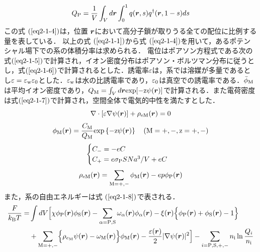 \documentclass[10.5pt,a4j]{jarticle}
\newcommand{\bvec}[1]{
\mbox{\boldmath $#1$}
}%
\begin{document}
\begin{equation}
\label{eq2-1-4}
Q_{\rm{P}}=\frac{1}{V}\int_{V} d{\bvec r}
\int_{0}^{1} q( \bvec{r},s )q^{\dag}( \bvec{r},1-s ) ds
\end{equation}
%
%
この式 $ (\ref{eq2-1-4}) $は，位置 $  \bvec{r} $において高分子鎖が取りうる全ての配位に比例する量を表している．
以上の式 $ (\ref{eq2-1-1}) $から式 $ (\ref{eq2-1-4}) $を用いて，あるポテンシャル場下での系の体積分率は求められる．
%
電位はポアソン方程式である次の式$(\ref{eq2-1-5})$で計算され，イオン密度分布はポアソン・ボルツマン分布に従うとし，式$(\ref{eq2-1-6})$で計算されるとした．誘電率$\varepsilon$は，系では溶媒が多量であるとし$\varepsilon=\varepsilon_{\rm{w}}\varepsilon_{0}$とした．$\varepsilon_{\rm{w}}$は水の比誘電率であり，$\varepsilon_{\rm{0}}$は真空での誘電率である．$\bar{\phi}_{\rm{M}}$は平均イオン密度であり，$Q_{\rm{M}}=\int_{V} d\bvec{r}\rm{exp}[-z\psi(\bvec{r})]$で計算される．また電荷密度は式$(\ref{eq2-1-7})$で計算され，空間全体で電気的中性を満たすとした．
%
\begin{equation}
	\label{eq2-1-5}
	\nabla\cdot[\varepsilon\nabla\psi(\bvec{r})]+\rho_{\rm{eM}}(\bvec{r})=0
\end{equation}
%
\vspace{0.05mm}
%
\begin{equation}
	\label{eq2-1-6}
	\phi_{\rm{M}}(\bvec{r})=\frac{C_{\rm{M}}}{Q_{\rm{M}}} \rm{exp}\left\{-z\psi(\bvec{r})\right\} \,\,\,\,\,\,(\rm{M}=+, -, z=+,-)
\end{equation}
%
%
\begin{eqnarray}
	\label{eq2-1-6-2}
	\begin{cases}
	C_{\rm{-}} = -eC & \\
	C_{\rm{+}} = e\sigma_{\rm{P}}SNa^3/V + eC &
	\end{cases}
\end{eqnarray}
%
%
\begin{equation}
	\label{eq2-1-7}
	\rho_{\rm{eM}}(\bvec{r})=\sum_{\rm{M}=+,-}\phi_{\rm{M}}(\bvec{r}) - ep\phi_{\rm{P}}(\bvec{r})
\end{equation}
また，系の自由エネルギーは式 $ (\ref{eq2-1-8}) $で表される．
\vspace{-2mm}
	\begin{equation}
		\label{eq2-1-8}
		\begin{split}
			\frac{F}{k_{\rm{B}}T}=&\int dV
			 	\Bigl[
				 \chi \phi_\mathrm{P}(\bm{r}) \phi_\mathrm{S}(\bm{r})
				 -\sum_{ \alpha=\mathrm{P},\mathrm{S} }
						\omega_\mathrm{\alpha}(\bm{r})\phi_\mathrm{\alpha}(\bm{r})
				 -\xi(\bm{r}) \Bigl\{ \phi_\mathrm{P}(\bm{r})+\phi_{\mathrm{S}}(\bm{r})-1 \Bigr\} \\
				 &+\sum_{\rm{M}=+,-}\Bigl\{ \rho_{e_{\rm{M}}}\psi(\bm{r})-\omega_{\rm{M}}(\bm{r})\Bigr\} \phi_{\rm{M}}(\bm{r})-\frac{\varepsilon(\bm{r})}{2}|\nabla\psi(\bm{r})|^2
				\Bigr]
			 -\sum_{i=\rm{P,S,+,-}} n_{\rm{i}} \ln \frac{Q_i}{n_{\rm{i}}}
		\end{split}
	\end{equation}
\end{document}
